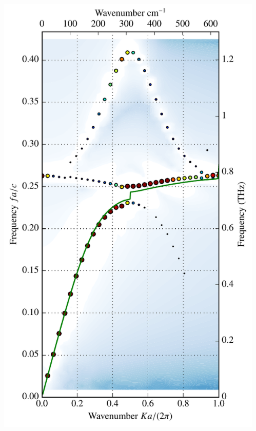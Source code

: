 \documentclass[t]{beamer} \usepackage[english]{babel} \usepackage[utf8]{inputenc} \usetheme{Frankfurt} %
\begin{document}
\begin{frame}[plain]{}
\begin{columns}[T]
\begin{column}{.55\textwidth}
	\end{column}%
	\begin{column}{.45\textwidth}
		\vspace{-1mm}\includegraphics[height=\paperheight]{../img-cdh-new/CDH_SRRArray_14.pdf} 
	\end{column}
\end{columns}
\end{frame} 		%
\end{document}
